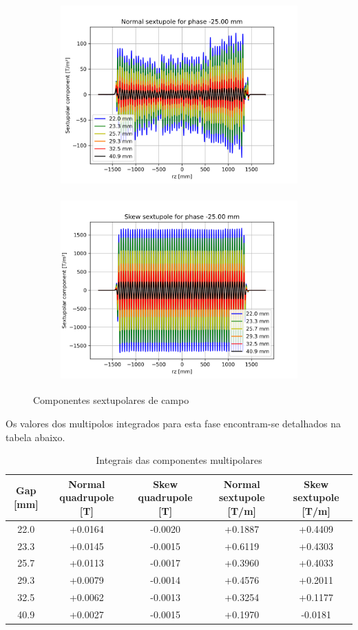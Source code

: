 \documentclass[a4paper,12pt]{article}
\begin{document}
\begin{figure}[H]
\begin{subfigure}{0.5\textwidth}
\includegraphics[width=0.9\linewidth, height=7cm]{figs/phase-25 Normal sextupole.png} 
\label{fig:subim1-25s}
\end{subfigure}
\begin{subfigure}{0.5\textwidth}
\includegraphics[width=0.9\linewidth, height=7cm]{figs/phase-25 Skew sextupole.png}
\label{fig:subim2-25s}
\end{subfigure}
\caption{Componentes sextupolares de campo}
\label{fig:sext-25}
\end{figure}

Os valores dos multipolos integrados para esta fase encontram-se detalhados na tabela abaixo.

\begin{table}[H]\footnotesize
\caption{Integrais das componentes multipolares}
\centering
\begin{tabular}{|c|c|c|c|c|}
\hline
   Gap [mm] &   Normal quadrupole [T] &   Skew quadrupole [T] &   Normal sextupole [T/m] &   Skew sextupole [T/m] \\
\hline
        22.0 & +0.0164 & -0.0020 & +0.1887 & +0.4409 \\
        23.3 & +0.0145 & -0.0015 & +0.6119 & +0.4303 \\
        25.7 & +0.0113 & -0.0017 & +0.3960 & +0.4033 \\
        29.3 & +0.0079 & -0.0014 & +0.4576 & +0.2011 \\
        32.5 & +0.0062 & -0.0013 & +0.3254 & +0.1177 \\
        40.9 & +0.0027 & -0.0015 & +0.1970 & -0.0181 \\
\hline
\end{tabular}
\end{table}
\end{document}
